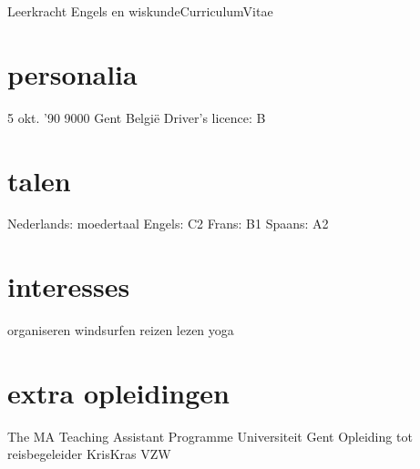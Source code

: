 \documentclass[]{friggeri-cv}
\begin{document}
       {Leerkracht Engels en wiskunde}{Curriculum}{Vitae}
 \begin{aside}
  \vspace{0.6cm}\section{personalia}
    5 okt. '90
    9000 Gent
    Belgi\"e\vspace{0.21cm}
    \vspace{0.21cm}
    Driver's licence: B \vspace{-1.25mm}
  \section{talen}
    Nederlands: moedertaal
    Engels: C2
    Frans:  B1  
    Spaans: A2\vspace{3.3mm}
  \section{interesses}
  organiseren
  windsurfen
  reizen
  lezen
  yoga\vspace{3.3mm}
  \section{extra opleidingen}
  The MA Teaching Assistant Programme
  {\footnotesize{}Universiteit Gent} \vspace{0.25cm}
  Opleiding tot reisbegeleider
  {\footnotesize{}KrisKras VZW} \vspace{3.3mm}
\end{aside}
\end{document}
